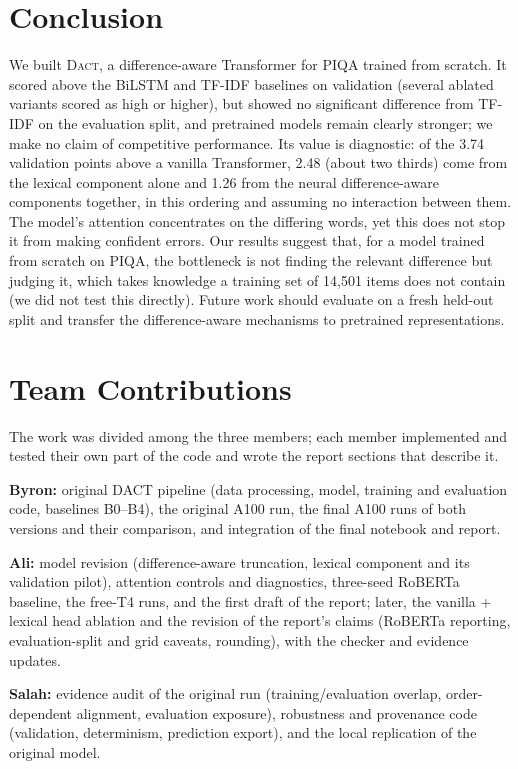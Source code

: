 \documentclass[11pt]{article}
\newcommand{\dact}{\textsc{Dact}}
\begin{document}
\section{Conclusion}
We built \dact{}, a difference-aware Transformer for PIQA trained from scratch. It scored above the BiLSTM and TF-IDF baselines on validation (several ablated variants scored as high or higher), but showed no significant difference from TF-IDF on the evaluation split, and pretrained models remain clearly stronger; we make no claim of competitive performance. Its value is diagnostic: of the 3.74 validation points above a vanilla Transformer, 2.48 (about two thirds) come from the lexical component alone and 1.26 from the neural difference-aware components together, in this ordering and assuming no interaction between them. The model's attention concentrates on the differing words, yet this does not stop it from making confident errors. Our results suggest that, for a model trained from scratch on PIQA, the bottleneck is not finding the relevant difference but judging it, which takes knowledge a training set of 14{,}501 items does not contain (we did not test this directly). Future work should evaluate on a fresh held-out split and transfer the difference-aware mechanisms to pretrained representations.

\section*{Team Contributions}
The work was divided among the three members; each member implemented and tested their own part of the code and wrote the report sections that describe it.

\textbf{Byron:} original DACT pipeline (data processing, model, training and evaluation code, baselines B0--B4), the original A100 run, the final A100 runs of both versions and their comparison, and integration of the final notebook and report.

\textbf{Ali:} model revision (difference-aware truncation, lexical component and its validation pilot), attention controls and diagnostics, three-seed RoBERTa baseline, the free-T4 runs, and the first draft of the report; later, the vanilla + lexical head ablation and the revision of the report's claims (RoBERTa reporting, evaluation-split and grid caveats, rounding), with the checker and evidence updates.

\textbf{Salah:} evidence audit of the original run (training/evaluation overlap, order-dependent alignment, evaluation exposure), robustness and provenance code (validation, determinism, prediction export), and the local replication of the original model.

\clearpage

\end{document}
